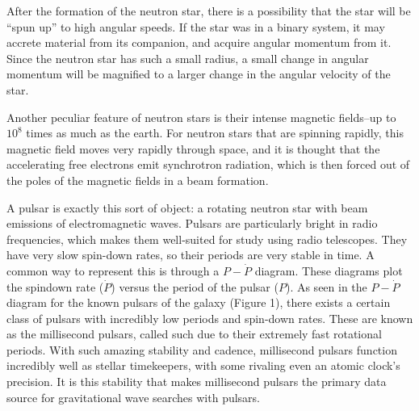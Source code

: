 \documentclass[12pt]{article}
\begin{document}
After the formation of the neutron star, there is a possibility that the star
will be ``spun up'' to high angular speeds. If the star was in a binary system,
it may accrete material from its companion, and acquire angular momentum from
it. Since the neutron star has such a small radius, a small change in angular momentum will
be magnified to a larger change in the angular velocity of the star.

Another peculiar feature of neutron stars is their intense magnetic fields--up
to $10^8$ times as much as the earth. For neutron stars that are spinning rapidly,
this magnetic field moves very rapidly through space, and it is thought that the accelerating free
electrons emit synchrotron radiation, which is then forced out of
the poles of the magnetic fields in a beam formation. 

A pulsar is exactly this sort of object: a rotating neutron star with beam
emissions of electromagnetic waves. Pulsars are particularly bright in radio
frequencies, which makes them well-suited for study using radio telescopes. They have
very slow spin-down rates, so their periods are very stable in time. A common
way to represent this is through a $P-\dot{P}$ diagram. These diagrams plot the
spindown rate ($\dot{P}$) versus the period of the pulsar ($P$).  As seen in the
$P-\dot{P}$ diagram for the known pulsars of the galaxy (Figure 1), there exists
a certain class of pulsars with incredibly low periods and spin-down rates.
These are known as the millisecond pulsars, called such due to their extremely
fast rotational periods.  With such amazing stability and cadence, millisecond
pulsars function incredibly well as stellar timekeepers, with some rivaling even
an atomic clock's precision. It is this stability that makes millisecond pulsars
the primary data source for gravitational wave searches with pulsars.
\end{document}
